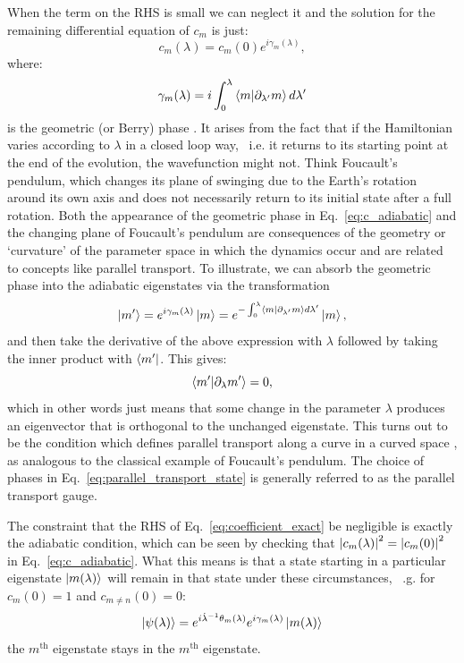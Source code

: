     When the term on the RHS is small we can neglect it and the solution for the remaining differential equation of $c_m$ is just:
    \begin{equation}\label{eq:c_adiabatic}
        c_m(\lambda) = c_m(0)e^{i \gamma_m(\lambda)},
    \end{equation}
    where:
    \begin{equation}\label{eq:geometric_phase}
        \gamma_m(\lambda) = i \int_0^{\lambda} \braket{m}{\partial_{\lambda'} m} d \lambda' 
    \end{equation}
    is the geometric (or Berry) phase \cite{pancharatnam_generalized_1956, longuet-higgins_studies_1958, berry_quantal_1984}. It arises from the fact that if the Hamiltonian varies according to $\lambda$ in a closed loop way, \@~i.e. it returns to its starting point at the end of the evolution, the wavefunction might not. Think Foucault's pendulum, which changes its plane of swinging due to the Earth's rotation around its own axis and does not necessarily return to its initial state after a full rotation. Both the appearance of the geometric phase in Eq.~\eqref{eq:c_adiabatic} and the changing plane of Foucault's pendulum are consequences of the geometry or `curvature' of the parameter space in which the dynamics occur and are related to concepts like parallel transport. To illustrate, we can absorb the geometric phase into the adiabatic eigenstates via the transformation
    \begin{equation}\label{eq:parallel_transport_state}
        \ket{m'} = e^{i \gamma_m(\lambda)}\ket{m} = e^{- \int_0^{\lambda} \braket{m}{\partial_{\lambda'} m} d \lambda'}\ket{m},
    \end{equation}
    and then take the derivative of the above expression with $\lambda$ followed by taking the inner product with $\bra{m'}$. This gives:
    \begin{equation}\label{eq:geometric_phase_cancellation}
        \braket{m'}{\partial_{\lambda} m'} = 0,
    \end{equation}
    which in other words just means that some change in the parameter $\lambda$ produces an eigenvector that is orthogonal to the unchanged eigenstate. This turns out to be the condition which defines parallel transport along a curve in a curved space \cite{nakahara_geometry_2003}, as analogous to the classical example of Foucault's pendulum. The choice of phases in Eq.~\eqref{eq:parallel_transport_state} is generally referred to as the parallel transport gauge.
    
    The constraint that the RHS of Eq.~\eqref{eq:coefficient_exact} be negligible is exactly the adiabatic condition, which can be seen by checking that $\abs{c_m(\lambda)}^2 = \abs{c_m(0)}^2$ in Eq.~\eqref{eq:c_adiabatic}. What this means is that a state starting in a particular eigenstate $\ket{m(\lambda)}$ will remain in that state under these circumstances, ~\@e.g. for $c_m(0) = 1$ and $c_{m \neq n}(0) = 0$:
    \begin{equation}\label{eq:adiabatic_states}
        \ket{\psi(\lambda)} = e^{i \dot{\lambda}^{-1} \theta_m(\lambda)}e^{i \gamma_m(\lambda)} \ket{m(\lambda)}
    \end{equation}
    the $m^{\text{th}}$ eigenstate stays in the $m^{\text{th}}$ eigenstate.
    
